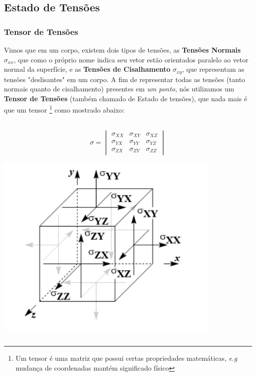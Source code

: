 \documentclass{article}
\begin{document}
\subsection{Estado de Tensões}

\subsubsection*{Tensor de Tensões}

Vimos que em um corpo, existem dois tipos de tensões, as \textbf{Tensões Normais} $\sigma_{xx}$, que como o próprio nome indica seu vetor estão orientados paralelo ao vetor normal da superfície, e as \textbf{Tensões de Cisalhamento} $\sigma_{xy}$, que representam as tensões "deslisantes" em um corpo. A fim de representar todas as tensões (tanto normais quanto de cisalhamento) presentes em \emph{um ponto}, nós utilizamos um  \textbf{Tensor de Tensões} (também chamado de Estado de tensões), que nada mais é que um tensor \footnote{Um tensor é uma matriz que possui certas propriedades matemáticas, \emph{e.g} mudança de coordenadas mantém significado físico} como mostrado abaixo:

$$$$
\begin{minipage}{.5\textwidth}
    \begin{align*}
        \sigma = \begin{vmatrix}
                     \sigma_{XX} & \sigma_{XY} & \sigma_{XZ} \\
                     \sigma_{YX} & \sigma_{YY} & \sigma_{YZ} \\
                     \sigma_{ZX} & \sigma_{ZY} & \sigma_{ZZ}
                 \end{vmatrix}
    \end{align*}
\end{minipage}
\begin{minipage}{.5\textwidth}
    \includegraphics[width=.5\textwidth]{imgs/tensões.png.png}
\end{minipage}
$$$$
\end{document}
